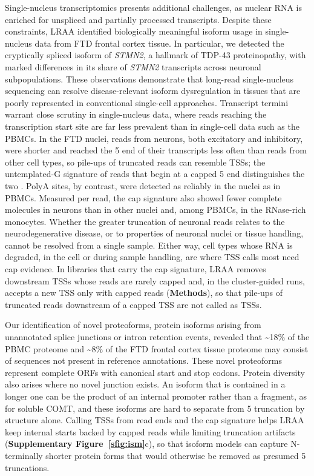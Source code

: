 Single-nucleus transcriptomics presents additional challenges, as nuclear RNA is enriched for unspliced and partially processed transcripts. Despite these constraints, LRAA identified biologically meaningful isoform usage in single-nucleus data from FTD frontal cortex tissue. In particular, we detected the cryptically spliced isoform of \emph{STMN2}, a hallmark of TDP-43 proteinopathy, with marked differences in its share of \emph{STMN2} transcripts across neuronal subpopulations. These observations demonstrate that long-read single-nucleus sequencing can resolve disease-relevant isoform dysregulation in tissues that are poorly represented in conventional single-cell approaches. Transcript termini warrant close scrutiny in single-nucleus data, where reads reaching the transcription start site are far less prevalent than in single-cell data such as the PBMCs. In the FTD nuclei, reads from neurons, both excitatory and inhibitory, were shorter and reached the 5\p{} end of their transcripts less often than reads from other cell types, so pile-ups of truncated reads can resemble TSSs; the untemplated-G signature of reads that begin at a capped 5\p{} end distinguishes the two \citep{cumbie2015}. PolyA sites, by contrast, were detected as reliably in the nuclei as in PBMCs. Measured per read, the cap signature also showed fewer complete molecules in neurons than in other nuclei and, among PBMCs, in the RNase-rich monocytes. Whether the greater truncation of neuronal reads relates to the neurodegenerative disease, or to properties of neuronal nuclei or tissue handling, cannot be resolved from a single sample. Either way, cell types whose RNA is degraded, in the cell or during sample handling, are where TSS calls most need cap evidence. In libraries that carry the cap signature, LRAA removes downstream TSSs whose reads are rarely capped and, in the cluster-guided runs, accepts a new TSS only with capped reads (\textbf{Methods}), so that pile-ups of truncated reads downstream of a capped TSS are not called as TSSs.

Our identification of novel proteoforms, protein isoforms arising from unannotated splice junctions or intron retention events, revealed that \textasciitilde18\% of the PBMC proteome and \textasciitilde8\% of the FTD frontal cortex tissue proteome may consist of sequences not present in reference annotations. These novel proteoforms represent complete ORFs with canonical start and stop codons. Protein diversity also arises where no novel junction exists. An isoform that is contained in a longer one can be the product of an internal promoter rather than a fragment, as for soluble COMT, and these isoforms are hard to separate from 5\p{} truncation by structure alone. Calling TSSs from read ends and the cap signature helps LRAA keep internal starts backed by capped reads while limiting truncation artifacts (\textbf{Supplementary Figure~\ref{sfig:ism}}c), so that isoform models can capture N-terminally shorter protein forms that would otherwise be removed as presumed 5\p{} truncations.

